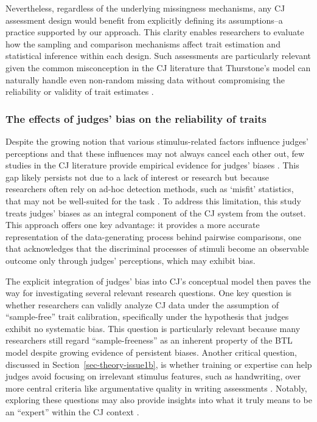 \documentclass[
  authoryear,
  review,
  1p]{elsarticle}
\begin{document}
Nevertheless, regardless of the underlying missingness mechanisms, any
CJ assessment design would benefit from explicitly defining its
assumptions--a practice supported by our approach. This clarity enables
researchers to evaluate how the sampling and comparison mechanisms
affect trait estimation and statistical inference within each design.
Such assessments are particularly relevant given the common
misconception in the CJ literature that Thurstone's model can naturally
handle even non-random missing data without compromising the reliability
or validity of trait estimates \citep{Bramley_2008}.

\subsubsection{The effects of judges' bias on the reliability of
traits}\label{sec-discussion_RA2}

Despite the growing notion that various stimulus-related factors
influence judges' perceptions
\citep{vanDaal_et_al_2016, Lesterhuis_et_al_2018, Chambers_et_al_2022}
and that these influences may not always cancel each other out, few
studies in the CJ literature provide empirical evidence for judges'
biases
\citep{Pollitt_et_al_2003, vanDaal_et_al_2016, Bartholomew_et_al_2020a}.
This gap likely persists not due to a lack of interest or research but
because researchers often rely on ad-hoc detection methods, such as
`misfit' statistics, that may not be well-suited for the task
\citep{Kelly_et_al_2022}. To address this limitation, this study treats
judges' biases as an integral component of the CJ system from the
outset. This approach offers one key advantage: it provides a more
accurate representation of the data-generating process behind pairwise
comparisons, one that acknowledges that the discriminal processes of
stimuli become an observable outcome only through judges' perceptions,
which may exhibit bias.

The explicit integration of judges' bias into CJ's conceptual model then
paves the way for investigating several relevant research questions. One
key question is whether researchers can validly analyze CJ data under
the assumption of ``sample-free'' trait calibration, specifically under
the hypothesis that judges exhibit no systematic bias. This question is
particularly relevant because many researchers still regard
``sample-freeness'' as an inherent property of the BTL model
\citep{Bramley_2008, Andrich_1978} despite growing evidence of
persistent biases. Another critical question, discussed in
Section~\ref{sec-theory-issue1b}, is whether training or expertise can
help judges avoid focusing on irrelevant stimulus features, such as
handwriting, over more central criteria like argumentative quality in
writing assessments \citep{Kelly_et_al_2022}. Notably, exploring these
questions may also provide insights into what it truly means to be an
``expert'' within the CJ context \citep{Kelly_et_al_2022}.
\end{document}
